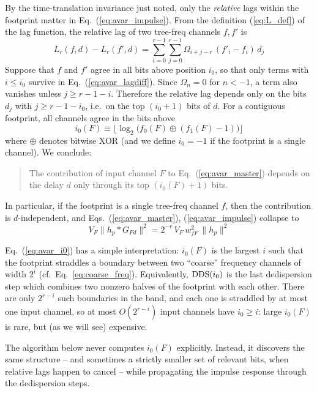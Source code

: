 \documentclass{article}
\numberwithin{equation}{section}   %
\def\DDS{{\rm DDS}}
\begin{document}
By the time-translation invariance just noted, only the {\em relative} lags within the footprint
matter in Eq.\ (\ref{eq:avar_impulse}). From the definition (\ref{eq:L_def}) of the lag function,
the relative lag of two tree-freq channels $f,f'$ is
\begin{equation}
L_r(f,d) - L_r(f',d) = \sum_{i=0}^{r-1} \sum_{j=0}^{r-1} \Omega_{i+j-r} \, (f'_i - f_i) \, d_j
  \label{eq:avar_lagdiff}
\end{equation}
Suppose that $f$ and $f'$ agree in all bits above position $i_0$, so that only terms with
$i \le i_0$ survive in Eq.\ (\ref{eq:avar_lagdiff}). Since $\Omega_n = 0$ for $n < -1$, a term also
vanishes unless $j \ge r-1-i$. Therefore the relative lag depends only on the bits $d_j$ with
$j \ge r-1-i_0$, i.e.\ on the top $(i_0+1)$ bits of $d$.
For a contiguous footprint, all channels agree in the bits above
\begin{equation}
i_0(F) \equiv \Big\lfloor \log_2 \big( f_0(F) \oplus (f_1(F)-1) \big) \Big\rfloor
  \label{eq:avar_i0}
\end{equation}
where $\oplus$ denotes bitwise XOR (and we define $i_0=-1$ if the footprint is a single channel).
We conclude:
\begin{quote}
The contribution of input channel $F$ to Eq.\ (\ref{eq:avar_master}) depends on the delay $d$ only
through its top $(i_0(F)+1)$ bits.
\end{quote}
In particular, if the footprint is a single tree-freq channel $f$, then the contribution is
$d$-independent, and Eqs.\ (\ref{eq:avar_master}), (\ref{eq:avar_impulse}) collapse to
\begin{equation}
V_F \big\| h_p * G_{Fd} \big\|^2 = 2^{-r} \, V_F \, w_{fF}^2 \, \|h_p\|^2
\end{equation}

Eq.\ (\ref{eq:avar_i0}) has a simple interpretation: $i_0(F)$ is the largest $i$ such that the
footprint straddles a boundary between two ``coarse'' frequency channels of width $2^i$
(cf.\ Eq.\ \ref{eq:coarse_freq}). Equivalently, $\DDS(i_0)$ is the last dedispersion step which
combines two nonzero halves of the footprint with each other. There are only $2^{r-i}$ such
boundaries in the band, and each one is straddled by at most one input channel, so at most
$O(2^{r-i})$ input channels have $i_0 \ge i$: large $i_0(F)$ is rare, but (as we will see)
expensive.

The algorithm below never computes $i_0(F)$ explicitly. Instead, it discovers the same structure
-- and sometimes a strictly smaller set of relevant bits, when relative lags happen to cancel --
while propagating the impulse response through the dedispersion steps.
\end{document}
